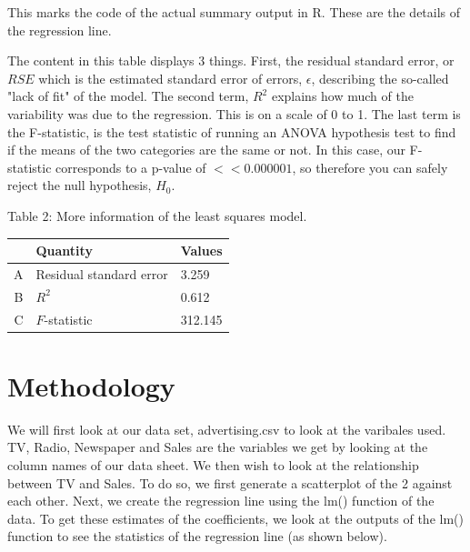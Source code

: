 \documentclass{article}
\begin{document}
This marks the code of the actual summary output in R.  These are the details of the regression line.


The content in this table displays 3 things.  First, the residual standard error, or $RSE$ which is the estimated standard error of errors, $\epsilon$, describing the so-called "lack of fit" of the model.  The second term, $R^2$ explains how much of the variability was due to the regression.  This is on a scale of 0 to 1.  The last term is the F-statistic, is the test statistic of running an ANOVA hypothesis test to find if the means of the two categories are the same or not.  In this case, our F-statistic corresponds to a p-value of $<<0.000001$, so therefore you can safely reject the null hypothesis, $H_0$.


\begin{center}

Table 2: More information of the least squares model.
\end{center}


\begin{table}[ht]
\centering
\begin{tabular}{rll}
  \hline
 & Quantity & Values \\ 
  \hline
A & Residual standard error & 3.259 \\ 
  B & $R^2$ & 0.612 \\ 
  C & $F$-statistic & 312.145 \\ 
   \hline
\end{tabular}
\end{table}



\section{Methodology}

We will first look at our data set, advertising.csv to look at the varibales used.  TV, Radio, Newspaper and Sales are the variables we get by looking at the column names of our data sheet.  We then wish to look at the relationship between TV and Sales.  To do so, we first generate a scatterplot of the 2 against each other.  Next, we create the regression line using the lm() function of the data. To get these estimates of the coefficients, we look at the outputs of the lm() function to see the statistics of the regression line (as shown below).  
\end{document}
